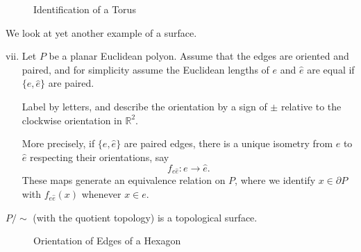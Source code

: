 \documentclass[12pt]{article}
\begin{document}
\begin{figure}[h]
	\centering
	\caption{Identification of a Torus}
	\label{fig:torus}
\end{figure}

\begin{exbox}
	We look at yet another example of a surface.
	\begin{enumerate}[(i)]
		\setcounter{enumi}{6}
		\item Let $P$ be a planar Euclidean polyon. Assume that the edges are oriented and paired, and for simplicity assume the Euclidean lengths of $e$ and $\hat e$ are equal if $\{e, \hat e\}$ are paired.

			Label by letters, and describe the orientation by a sign of $\pm$ relative to the clockwise orientation in $\mathbb{R}^2$.

			More precisely, if $\{e, \hat e\}$ are paired edges, there is a unique isometry from $e$ to $\hat e$ respecting their orientations, say
			\[
			f_{e \hat e} : e \to \hat e
			.\]
			These maps generate an equivalence relation on $P$, where we identify $x \in \partial P$ with $f_{e \hat e}(x)$ whenever $x \in e$.
	\end{enumerate}
\end{exbox}

\begin{lemma}
	$P/\sim$ (with the quotient topology) is a topological surface.
\end{lemma}

\begin{figure}[h]
	\centering
	\caption{Orientation of Edges of a Hexagon}
	\label{fig:hexagon}
\end{figure}
\end{document}

